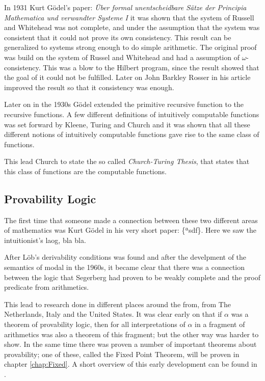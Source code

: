 \documentclass[../main.tex]{subfiles}
\begin{document}
In 1931 Kurt Gödel's paper: \textit{Über formal unentscheidbare Sätze der
Principia Mathematica und verwandter Systeme I} it was shown  that the system of
Russell and Whitehead was not complete, and under the assumption that the
system was consistent that it could not prove its own consistency.
This result can be generalized to systems strong enough to do simple
arithmetic.
The
original proof was build on the system of Russel and Whitehead and had a
assumption of $\omega$-consistency. This
was a blow to the Hilbert program, since the result showed that the goal of it
could not be fulfilled. Later on John Barkley Rosser in his article
\cite{Ross1936} improved the
result so that it  consistency was enough.

Later on in the 1930s Gödel extended the primitive recursive function to the  recursive
functions. A few different definitions of intuitively computable functions was
set forward by Kleene, Turing and Church and it was shown that all these
different notions of intuitively computable functions gave rise to the same
class of functions.

This lead Church to state the so called \textit{Church-Turing Thesis}, that
states that this class of functions are the computable functions.


\subsection{Provability Logic}
The first time that someone made a connection between these two different areas
of mathematics was Kurt Gödel in his very short  paper: \{ªsdf\}. Here we saw
the intuitionist's laog, bla bla.

After Löb's derivability conditions was found and after the develpment of the
semantics of modal in the 1960s, it became clear that there was a connection
between the logic that Segerberg had proven to be weakly complete and the proof
predicate from arithmetics.

This lead to research done in different places around the from, from The
Netherlands, Italy and the United States. It was clear early on that if
$\alpha$ was a theorem of provability logic, then for all interpretations of
$\alpha$ in a fragment of arithmetics was also a theorem of this fragment; but
the other way was harder to show. In the same time there was proven a number of
important theorems about provability; one of these, called the Fixed Point
Theorem,  will be proven in chapter
\ref{chap:Fixed}.
A short overview of this early
development can be found in \cite{Bool1991}.
\end{document}
